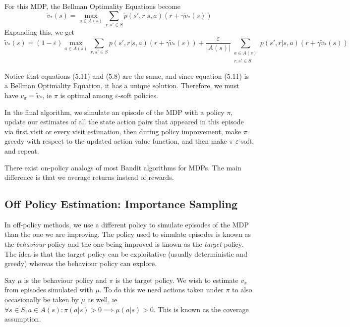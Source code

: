 \documentclass[12pt]{report}
\begin{document}
For this MDP, the Bellman Optimality Equations become
\begin{equation}
    \tilde{v}_{*}(s) = \max_{a \in A(s)} \sum_{r, s' \in S} \tilde{p}(s', r | s, a)(r + \gamma \tilde{v}_{*}(s))
\end{equation}
Expanding this, we get
\begin{equation}
    \tilde{v}_{*}(s) = (1 - \varepsilon) \max_{a \in A(s)} \sum_{r, s' \in S} p(s', r | s, a)(r + \gamma \tilde{v}_{*}(s)) + \frac{\varepsilon}{\left|A(s)\right|} \sum_{\substack{a \in A(s)\\r, s' \in S}} p(s', r | s, a)(r + \gamma \tilde{v}_{*}(s))
\end{equation}

Notice that equations (5.11) and (5.8) are the same, and since equation (5.11) is a Bellman Optimality Equation, it has a unique solution. Therefore, we must have $v_{\pi} = \tilde{v}_{*}$, ie $\pi$ is optimal among $\varepsilon$-soft policies.

In the final algorithm, we simulate an episode of the MDP with a policy $\pi$, update our estimates of all the state action pairs that appeared in this episode via first visit or every visit estimation, then during policy improvement, make $\pi$ greedy with respect to the updated action value function, and then make $\pi$ $\varepsilon$-soft, and repeat.

There exist on-policy analogs of most Bandit algorithms for MDPs. The main difference is that we average returns instead of rewards. 

\subsection{Off Policy Estimation: Importance Sampling}
In off-policy methods, we use a different policy to simulate episodes of the MDP than the one we are improving. The policy used to simulate episodes is known as the \textit{behaviour} policy and the one being improved is known as the \textit{target} policy. The idea is that the target policy can be exploitative (usually deterministic and greedy) whereas the behaviour policy can explore.

Say $\mu$ is the behaviour policy and $\pi$ is the target policy. We wish to estimate $v_{\pi}$ from episodes simulated with $\mu$. To do this we need actions taken under $\pi$ to also occasionally be taken by $\mu$ as well, ie $\forall s \in S, a \in A(s): \pi(a | s) > 0 \implies \mu(a | s) > 0$. This is known as the coverage assumption.
\end{document}
